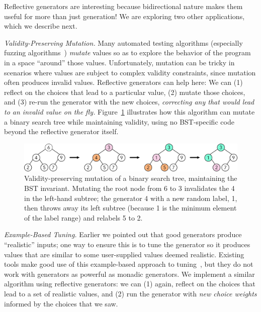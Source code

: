 Reflective generators are interesting because
bidirectional nature makes them useful for more than just generation!
We are exploring two other applications, which we describe
next.

\medskip

{\em Validity-Preserving Mutation.}
Many automated testing algorithms
(especially fuzzing algorithms~\cite{afl-readme}) {\em mutate} values
so as to explore
the behavior of the program in a space ``around'' those
values. Unfortunately, mutation can be
tricky in scenarios where values are subject to complex validity
constraints, since mutation often produces invalid values. Reflective
generators can help here: We can (1) reflect on the choices that lead
to a particular
value, (2) mutate those choices, and (3) re-run the generator with the new
choices, {\em correcting any that
would lead to an invalid value on the fly.} Figure~\ref{fig:mutation}
illustrates how this
algorithm can mutate a binary search tree while maintaining validity,
using no BST-specific code beyond the reflective generator itself.
\begin{figure}[t]
  \centering
  \includegraphics[width=.6\textwidth]{assets/mutate-diagram.pdf}
  \vspace{-2mm}
  \caption{Validity-preserving mutation of a binary search tree, maintaining the
  BST invariant. Mutating the root node from 6 to 3 invalidates the
  4 in the left-hand subtree; the generator 4 with a new random label,
1, then throws away its left subtree (because 1 is the
minimum element of the label range) and relabels 5 to 2.}\label{fig:mutation}
\end{figure}

\medskip

{\em Example-Based Tuning.} Earlier we pointed out that good generators
produce ``realistic'' inputs; one way to ensure this is to tune the generator so
it produces values that are similar to some user-supplied values deemed
realistic. Existing tools make good use of this example-based approach to
tuning~\cite{soremekun2020inputs}, but they do not work with generators as
powerful as monadic generators. We implement a similar algorithm using
reflective generators: we can (1) again, reflect on the choices that lead to a
set of realistic values, and (2) run the generator with {\em new choice weights}
informed by the choices that we saw.

